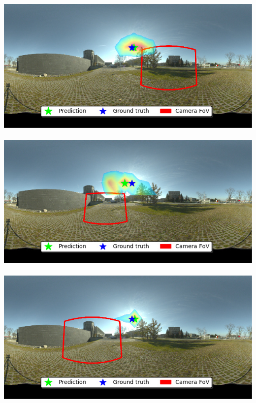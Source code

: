 \begin{minipage}{\linewidth}
\begin{multicols}{4}
\includegraphics[width=\mywidth]{AG8A2917_Panorama_hdr-corrected.jpg}\\
\vspace{\panoheight}\\
\includegraphics[width=\mywidth]{AG8A2917_Panorama_hdr-corrected_003.jpg}\\
\vspace{\panoheight}\\
\includegraphics[width=\mywidth]{AG8A2917_Panorama_hdr-corrected_005.jpg}\\
\vspace{\panoheight}\\

\end{multicols}
\end{minipage}
